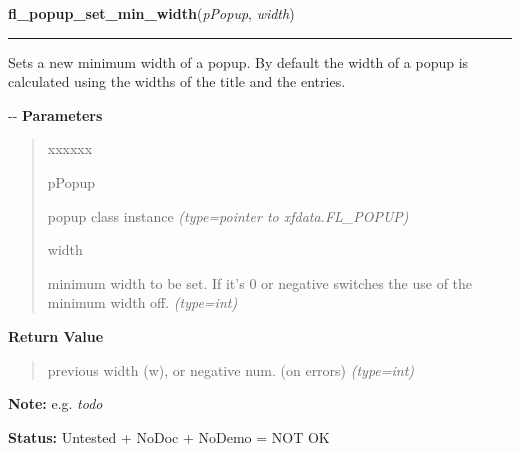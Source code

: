 \hspace{.8\funcindent}\begin{boxedminipage}{\funcwidth}

    \raggedright \textbf{fl\_popup\_set\_min\_width}(\textit{pPopup}, \textit{width})

    \vspace{-1.5ex}

    \rule{\textwidth}{0.5\fboxrule}
\setlength{\parskip}{2ex}

Sets a new minimum width of a popup. By default the width of a popup
is calculated using the widths of the title and the entries.

-{}-
\setlength{\parskip}{1ex}
      \textbf{Parameters}
      \vspace{-1ex}

      \begin{quote}
        \begin{Ventry}{xxxxxx}

          \item[pPopup]


popup class instance
            {\it (type=pointer to xfdata.FL\_POPUP)}

          \item[width]


minimum width to be set. If it's 0 or negative switches the use of
the minimum width off.
            {\it (type=int)}

        \end{Ventry}

      \end{quote}

      \textbf{Return Value}
    \vspace{-1ex}

      \begin{quote}

previous width (w), or negative num. (on errors)
      {\it (type=int)}

      \end{quote}

\textbf{Note:} 
e.g. \emph{todo}


\textbf{Status:} 
Untested + NoDoc + NoDemo = NOT OK


    \end{boxedminipage}

